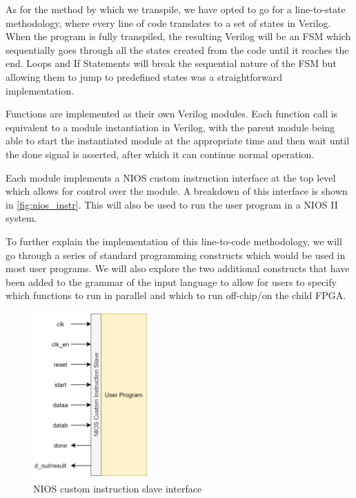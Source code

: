 As for the method by which we transpile, we have opted to go for a line-to-state methodology, where every line of code translates to a set of states in Verilog. When the program is fully transpiled, the resulting Verilog will be an FSM which sequentially goes through all the states created from the code until it reaches the end. Loops and If Statements will break the sequential nature of the FSM but allowing them to jump to predefined states was a straightforward implementation.

Functions are implemented as their own Verilog modules. Each function call is equivalent to a module instantiation in Verilog, with the parent module being able to start the instantiated module at the appropriate time and then wait until the done signal is asserted, after which it can continue normal operation.

Each module implements a NIOS custom instruction interface \cite{nios-ii-inst-guide} at the top level which allows for control over the module. A breakdown of this interface is shown in \autoref{fig:nios_instr}. This will also be used to run the user program in a NIOS II system.

To further explain the implementation of this line-to-code methodology, we will go through a series of standard programming constructs which would be used in most user programs. We will also explore the two additional constructs that have been added to the grammar of the input language to allow for users to specify which functions to run in parallel and which to run off-chip/on the child FPGA.

\begin{figure}[!h]
    \centering
    \includegraphics[width=0.4\textwidth]{04_Implementation/images/custom_instr_interface.png}
    \caption{NIOS custom instruction slave interface}
    \label{fig:nios_instr}
\end{figure}

